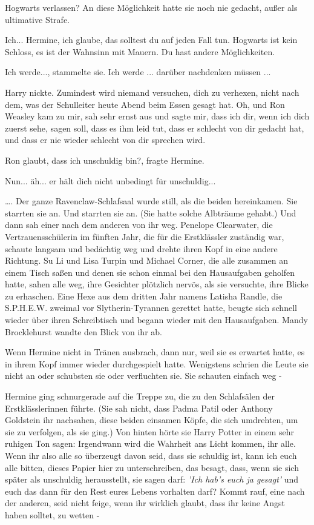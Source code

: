 \glqq Hogwarts verlassen?\grqq{} An diese Möglichkeit hatte sie noch nie
gedacht, außer als ultimative Strafe.

\glqq Ich... Hermine, ich glaube, das solltest du auf jeden Fall tun. Hogwarts
ist kein Schloss, es ist der Wahnsinn mit Mauern. Du hast andere
Möglichkeiten.\grqq{}

\glqq Ich werde...\grqq{}, stammelte sie. \glqq Ich werde ... darüber nachdenken
müssen ...\grqq{}

Harry nickte. \glqq Zumindest wird niemand versuchen, dich zu verhexen, nicht
nach dem, was der Schulleiter heute Abend beim Essen gesagt hat. Oh, und Ron
Weasley kam zu mir, sah sehr ernst aus und sagte mir, dass ich dir, wenn ich
dich zuerst sehe, sagen soll, dass es ihm leid tut, dass er schlecht von dir
gedacht hat, und dass er nie wieder schlecht von dir sprechen wird.\grqq{}

\glqq Ron glaubt, dass ich unschuldig bin?\grqq{}, fragte Hermine.

\glqq Nun... äh... er hält dich nicht unbedingt für unschuldig...\grqq{}

…. Der ganze Ravenclaw-Schlafsaal wurde still, als die beiden hereinkamen. Sie
starrten sie an. Und starrten sie an. (Sie hatte solche Albträume gehabt.) Und
dann sah einer nach dem anderen von ihr weg. Penelope Clearwater, die
Vertrauensschülerin im fünften Jahr, die für die Erstklässler zuständig war,
schaute langsam und bedächtig weg und drehte ihren Kopf in eine andere Richtung.
Su Li und Lisa Turpin und Michael Corner, die alle zusammen an einem Tisch saßen
und denen sie schon einmal bei den Hausaufgaben geholfen hatte, sahen alle weg,
ihre Gesichter plötzlich nervös, als sie versuchte, ihre Blicke zu erhaschen.
Eine Hexe aus dem dritten Jahr namens Latisha Randle, die S.P.H.E.W. zweimal vor
Slytherin-Tyrannen gerettet hatte, beugte sich schnell wieder über ihren
Schreibtisch und begann wieder mit den Hausaufgaben. Mandy Brocklehurst wandte
den Blick von ihr ab.

Wenn Hermine nicht in Tränen ausbrach, dann nur, weil sie es erwartet hatte, es
in ihrem Kopf immer wieder durchgespielt hatte. Wenigstens schrien die Leute sie
nicht an oder schubsten sie oder verfluchten sie. Sie schauten einfach weg -

Hermine ging schnurgerade auf die Treppe zu, die zu den Schlafsälen der
Erstklässlerinnen führte. (Sie sah nicht, dass Padma Patil oder Anthony
Goldstein ihr nachsahen, diese beiden einsamen Köpfe, die sich umdrehten, um sie
zu verfolgen, als sie ging.) Von hinten hörte sie Harry Potter in einem sehr
ruhigen Ton sagen: \glqq Irgendwann wird die Wahrheit ans Licht kommen, ihr
alle. Wenn ihr also alle so überzeugt davon seid, dass sie schuldig ist, kann
ich euch alle bitten, dieses Papier hier zu unterschreiben, das besagt, dass,
wenn sie sich später als unschuldig herausstellt, sie sagen darf:\emph{ 'Ich
hab's euch ja gesagt' }und euch das dann für den Rest eures Lebens vorhalten
darf? Kommt rauf, eine nach der anderen, seid nicht feige, wenn ihr wirklich
glaubt, dass ihr keine Angst haben solltet, zu wetten -\grqq{}

